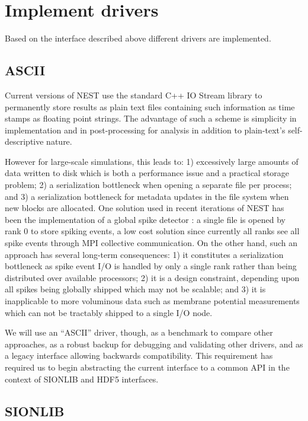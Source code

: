 \documentclass[]{YIC2015}
\begin{document}
\section{Implement drivers}
Based on the interface described above different drivers are
implemented.

\subsection{ASCII}
Current versions of NEST use the standard C++ IO Stream library
\cite{stream} to permanently store results as plain text files
containing such information as time stamps as floating point
strings. The advantage of such a scheme is simplicity in
implementation and in post-processing for analysis in addition to
plain-text's self-descriptive nature.

However for large-scale simulations, this leads to: 1) excessively
large amounts of data written to disk which is both a performance
issue and a practical storage problem; 2) a serialization bottleneck
when opening a separate file per process; and 3) a serialization
bottleneck for metadata updates in the file system when new blocks are
allocated. One solution used in recent iterations of NEST has been the
implementation of a global spike detector \cite{gsd}: a single file is
opened by rank 0 to store spiking events, a low cost solution since
currently all ranks see all spike events through MPI collective
communication. On the other hand, such an approach has several
long-term consequences: 1) it constitutes a serialization bottleneck
as spike event I/O is handled by only a single rank rather than being
distributed over available processors; 2) it is a design constraint,
depending upon all spikes being globally shipped which may not be
scalable; and 3) it is inapplicable to more voluminous data such as
membrane potential measurements which can not be tractably shipped to
a single I/O node.

We will use an ``ASCII'' driver, though, as a benchmark to compare
other approaches, as a robust backup for debugging and validating
other drivers, and as a legacy interface allowing backwards
compatibility. This requirement has required us to begin abstracting
the current interface to a common API in the context of SIONLIB and
HDF5 interfaces.

\subsection{SIONLIB}
\end{document}
